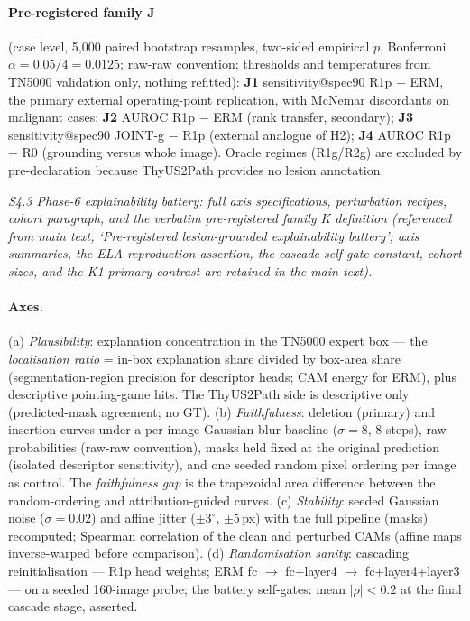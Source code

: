 \documentclass[11pt]{article}
\begin{document}
\paragraph{Pre-registered family J} (case level, 5{,}000 paired bootstrap
resamples, two-sided empirical $p$, Bonferroni
$\alpha = 0.05/4 = 0.0125$; raw-raw convention; thresholds and
temperatures from TN5000 validation only, nothing refitted):
\textbf{J1} sensitivity@spec90 R1p $-$ ERM, the primary external
operating-point replication, with McNemar discordants on malignant
cases; \textbf{J2} AUROC R1p $-$ ERM (rank transfer, secondary);
\textbf{J3} sensitivity@spec90 JOINT-g $-$ R1p (external analogue of
H2); \textbf{J4} AUROC R1p $-$ R0 (grounding versus whole image).
Oracle regimes (R1g/R2g) are excluded by pre-declaration because
ThyUS2Path provides no lesion annotation.


\noindent\emph{S4.3 Phase-6 explainability battery: full axis specifications, perturbation recipes, cohort paragraph, and the verbatim pre-registered family K definition (referenced from main text, `Pre-registered lesion-grounded explainability battery'; axis summaries, the ELA reproduction assertion, the cascade self-gate constant, cohort sizes, and the K1 primary contrast are retained in the main text).}

\paragraph{Axes.} (a) \emph{Plausibility}: explanation concentration in
the TN5000 expert box --- the \emph{localisation ratio} = in-box
explanation share divided by box-area share (segmentation-region
precision for descriptor heads; CAM energy for ERM), plus descriptive
pointing-game hits. The ThyUS2Path side is descriptive only (predicted-mask
agreement; no GT). (b) \emph{Faithfulness}: deletion (primary) and
insertion curves under a per-image Gaussian-blur baseline
($\sigma = 8$, 8 steps), raw probabilities (raw-raw convention), masks
held fixed at the original prediction (isolated descriptor sensitivity),
and one seeded random pixel ordering per image as control. The
\emph{faithfulness gap} is the trapezoidal area difference between the
random-ordering and attribution-guided curves. (c) \emph{Stability}:
seeded Gaussian noise ($\sigma = 0.02$) and affine jitter ($\pm 3^{\circ}$,
$\pm 5$\,px) with the full pipeline (masks) recomputed; Spearman
correlation of the clean and perturbed CAMs (affine maps inverse-warped
before comparison). (d) \emph{Randomisation sanity}: cascading
reinitialisation --- R1p head weights; ERM fc $\to$ fc+layer4 $\to$
fc+layer4+layer3 --- on a seeded 160-image probe; the battery self-gates:
mean $\lvert\rho\rvert < 0.2$ at the final cascade stage, asserted.
\end{document}
